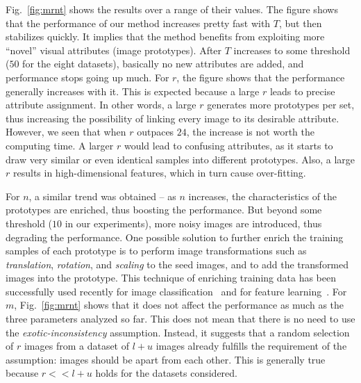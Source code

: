 Fig.~\ref{fig:mrnt} shows the results over a range of their
values. The figure shows that the performance of our method increases
pretty fast with $T$, but then stabilizes quickly. It implies that the
method benefits from exploiting more ``novel'' visual attributes
(image prototypes). After $T$ increases to some threshold (\eg $50$
for the eight datasets), basically no new attributes are added, and performance stops going up much. 
For $r$, the
figure shows that the performance generally increases with it. This is
expected because a large $r$ leads to precise attribute
assignment. In other words, a large $r$ generates more
prototypes per set, thus increasing the possibility of linking every
image to its desirable attribute.  However, we seen that when $r$
outpaces $24$, the increase is not worth the computing time. A larger
$r$ would lead to confusing attributes, as it starts to draw very
similar or even identical samples into different prototypes.  Also, a
large $r$ results in high-dimensional features, which in turn
cause over-fitting. 

For $n$, a similar trend was obtained -- as $n$ increases, the
characteristics of the prototypes are enriched, thus boosting the
performance. But beyond some threshold (\eg $10$ in our experiments),
more noisy images are introduced, thus degrading the performance. One
possible solution to further enrich the training samples of each
prototype is to perform image transformations such as
\emph{translation}, \emph{rotation}, and \emph{scaling} to the seed
images, and to add the transformed images into the prototype. This
technique of enriching training data has been successfully used
recently for image classification~\citep{transformation:cvpr14} and for feature learning~\citep{cnnfet14}.  For $m$, Fig.~\ref{fig:mrnt} shows
that it does not affect the performance as much as the three parameters
analyzed so far. This does not mean that there is no need to use the
\emph{exotic-inconsistency} assumption. Instead, it suggests that a
random selection of $r$ images from a dataset of $l+u$ images already
fulfills the requirement of the assumption: images should be apart
from each other.  This is generally true because $r << l+u$ holds for
the datasets considered.
  


